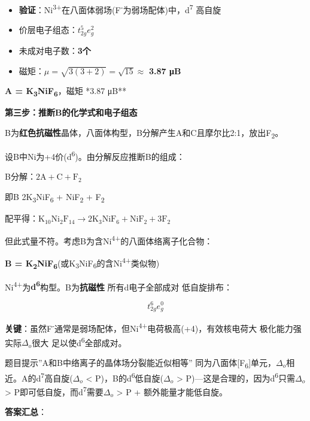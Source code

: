 \begin{itemize}
\tightlist
\item
  \textbf{验证}：Ni\textsuperscript{3+}在八面体弱场(F\textsuperscript{-}为弱场配体)中，d\textsuperscript{7} \箭 高自旋
\item
  价层电子组态：\(t_{2g}^{5}e_{g}^{2}\)
\item
  未成对电子数：\textbf{3个}
\item
  磁矩：\(\mu = \sqrt{3(3+2)} = \sqrt{15} \approx\) \textbf{3.87 μB}
\end{itemize}

\textbf{A = K\textsubscript{3}NiF\textsubscript{6}}，磁矩 *3.87 μB**

\textbf{第三步：推断B的化学式和电子组态}

B为\textbf{红色抗磁性}晶体，八面体构型，B分解产生A和C且摩尔比2:1，放出F\textsubscript{2}。

设B中Ni为+4价(d\textsuperscript{6})。由分解反应推断B的组成：

B分解：\(2\text{A} + \text{C} + \text{F}_2\)

即B \箭 2K\textsubscript{3}NiF\textsubscript{6} + NiF\textsubscript{2} + F\textsubscript{2}

配平得：\(\text{K}_{10}\text{Ni}_2\text{F}_{14} \rightarrow 2\text{K}_3\text{NiF}_6 + \text{NiF}_2 + 3\text{F}_2\)

但此式量不符。考虑B为含Ni\textsuperscript{4+}的八面体络离子化合物：

\textbf{B = K\textsubscript{2}NiF\textsubscript{6}}(或K\textsubscript{3}NiF\textsubscript{6}的含Ni\textsuperscript{4+}类似物)

Ni\textsuperscript{4+}为\textbf{d\textsuperscript{6}}构型。B为\textbf{抗磁性} \箭 所有d电子全部成对 \箭 低自旋排布：

\[t_{2g}^{6}e_{g}^{0}\]

\textbf{关键}：虽然F\textsuperscript{-}通常是弱场配体，但Ni\textsuperscript{4+}电荷极高(+4)，有效核电荷大 \箭 极化能力强 \箭 实际\(\Delta_o\)很大 \箭 足以使d\textsuperscript{6}全部成对。

题目提示''A和B中络离子的晶体场分裂能近似相等'' \箭 同为八面体{[}F\textsubscript{6}{]}单元，\(\Delta_o\)相近。A的d\textsuperscript{7}高自旋(\(\Delta_o\) \textless{} P)，B的d\textsuperscript{6}低自旋(\(\Delta_o\) \textgreater{} P)---这是合理的，因为d\textsuperscript{6}只需\(\Delta_o\) \textgreater{} P即可低自旋，而d\textsuperscript{7}需要\(\Delta_o\) \textgreater{} P + 额外能量才能低自旋。

\textbf{答案汇总}：

